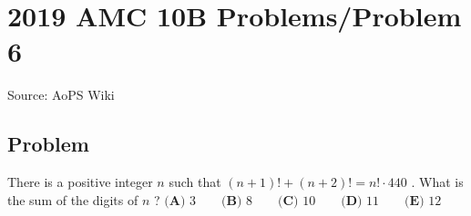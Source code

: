 \documentclass[12pt]{article}
\begin{document}
\section*{{2019 AMC 10B Problems/Problem 6}}
Source: AoPS Wiki

\subsection*{Problem}
There is a positive integer $n$ such that $(n+1)! + (n+2)! = n! \cdot 440$ . What is the sum of the digits of $n$ ? $\textbf{(A) }3\qquad\textbf{(B) }8\qquad\textbf{(C) }10\qquad\textbf{(D) }11\qquad\textbf{(E) }12$
\end{document}
